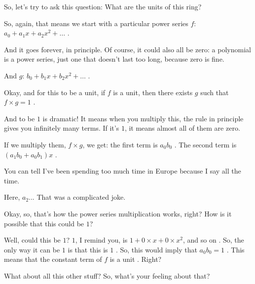 \begin{speech}[00:32:38 - 00:35:07]
So, let's try to ask this question: What are the units of this ring? 

So, again, that means we start with a particular power series $f$: $a_0 + a_1 x + a_2 x^2 + \dots$ .

And it goes forever, in principle. Of course, it could also all be zero: a polynomial is a power series, just one that doesn't last too long, because zero is fine.

And $g$: $b_0 + b_1 x + b_2 x^2 + \dots$ .

Okay, and for this to be a unit, if $f$ is a unit, then there exists $g$ such that $f \times g = 1$ .

And to be $1$ is dramatic! It means when you multiply this, the rule in principle gives you infinitely many terms. If it's $1$, it means almost all of them are zero.

If we multiply them, $f \times g$, we get: the first term is $a_0 b_0$ . The second term is $(a_1 b_0 + a_0 b_1) x$ .

You can tell I've been spending too much time in Europe because I say  all the time. 

Here, $a_2$... That was a complicated joke. 

Okay, so, that's how the power series multiplication works, right? How is it possible that this could be $1$?

Well, could this be $1$? $1$, I remind you, is $1 + 0 \times x + 0 \times x^2$, and so on . So, the only way it can be $1$ is that this is $1$ . So, this would imply that $a_0 b_0 = 1$ . This means that the constant term of $f$ is a unit . Right?

What about all this other stuff? So, what's your feeling about that?
\end{speech}

